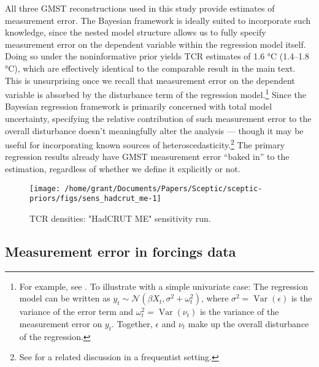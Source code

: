 \documentclass[
]{article}
\begin{document}
All three GMST reconstructions used in this study provide estimates of
measurement error. The Bayesian framework is ideally suited to
incorporate such knowledge, since the nested model structure allows us
to fully specify measurement error on the dependent variable within the
regression model itself. Doing so under the noninformative prior yields
TCR estimates of 1.6 °C (1.4--1.8 °C), which are effectively identical
to the comparable result in the main text. This is unsurprising once we
recall that measurement error on the dependent variable is absorbed by
the disturbance term of the regression model.\footnote{For example, see
  \cite[p. 326]{greene2007econometric}. To illustrate with a simple
  univariate case: The regression model can be written as
  \(y_t \sim \mathcal{N}(\beta X_t, \sigma^2 + \omega_t^2)\), where
  \(\sigma^2 = \mathop{\mathrm{Var}}(\epsilon)\) is the variance of the
  error term and \(\omega_t^2 = \mathop{\mathrm{Var}}(\nu_t)\) is the
  variance of the measurement error on \(y_t\). Together, \(\epsilon\)
  and \(\nu_t\) make up the overall disturbance of the regression.}
Since the Bayesian regression framework is primarily concerned with
total model uncertainty, specifying the relative contribution of such
measurement error to the overall disturbance doesn't meaningfully alter
the analysis --- though it may be useful for incorporating known sources
of heteroscedasticity.\footnote{See \cite{lewis2005edv} for a related
  discussion in a frequentist setting.} The primary regression results
already have GMST measurement error ``baked in'' to the estimation,
regardless of whether we define it explicitly or not.

\begin{figure}[H]

{\centering \texttt{[image: /home/grant/Documents/Papers/Sceptic/sceptic-priors/figs/sens\_hadcrut\_me-1]} 

}

\caption{TCR densities: "HadCRUT ME" sensitivity run.}\label{fig:sens_hadcrut_me}
\end{figure}

\newpage
\pagebreak

\hypertarget{measurement-error-in-forcings-data}{%
\subsection{Measurement error in forcings
data}\label{measurement-error-in-forcings-data}}
\end{document}
